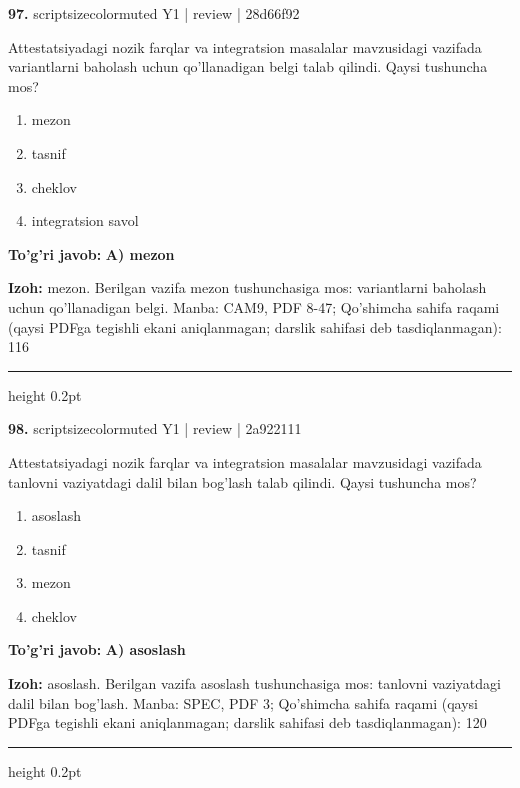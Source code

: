 \documentclass[10pt,a4paper]{article}
\begin{document}
{\bfseries\sffamily\color{ink} 97.} {scriptsizecolor{muted} Y1 | review | 28d66f92}
\par
Attestatsiyadagi nozik farqlar va integratsion masalalar mavzusidagi vazifada variantlarni baholash uchun qo'llanadigan belgi talab qilindi. Qaysi tushuncha mos?
\begin{enumerate}[label=\Alph*),leftmargin=9mm]
\item mezon
\item tasnif
\item cheklov
\item integratsion savol
\end{enumerate}
\begin{tcolorbox}[enhanced,breakable,colback=teal!4,colframe=teal!60!black,boxrule=0.45pt,arc=1.2mm,left=2.7mm,right=2.7mm,top=1.8mm,bottom=1.8mm,before skip=2mm,after skip=2mm]
{\bfseries\sffamily\color{teal}To'g'ri javob:} \textbf{A) mezon}
\par\smallskip
{\bfseries Izoh:} mezon. Berilgan vazifa mezon tushunchasiga mos: variantlarni baholash uchun qo'llanadigan belgi. Manba: CAM9, PDF 8-47; Qo'shimcha sahifa raqami (qaysi PDFga tegishli ekani aniqlanmagan; darslik sahifasi deb tasdiqlanmagan): 116
\end{tcolorbox}
\vspace{2mm}\hrule height 0.2pt\vspace{3mm}

{\bfseries\sffamily\color{ink} 98.} {scriptsizecolor{muted} Y1 | review | 2a922111}
\par
Attestatsiyadagi nozik farqlar va integratsion masalalar mavzusidagi vazifada tanlovni vaziyatdagi dalil bilan bog'lash talab qilindi. Qaysi tushuncha mos?
\begin{enumerate}[label=\Alph*),leftmargin=9mm]
\item asoslash
\item tasnif
\item mezon
\item cheklov
\end{enumerate}
\begin{tcolorbox}[enhanced,breakable,colback=teal!4,colframe=teal!60!black,boxrule=0.45pt,arc=1.2mm,left=2.7mm,right=2.7mm,top=1.8mm,bottom=1.8mm,before skip=2mm,after skip=2mm]
{\bfseries\sffamily\color{teal}To'g'ri javob:} \textbf{A) asoslash}
\par\smallskip
{\bfseries Izoh:} asoslash. Berilgan vazifa asoslash tushunchasiga mos: tanlovni vaziyatdagi dalil bilan bog'lash. Manba: SPEC, PDF 3; Qo'shimcha sahifa raqami (qaysi PDFga tegishli ekani aniqlanmagan; darslik sahifasi deb tasdiqlanmagan): 120
\end{tcolorbox}
\vspace{2mm}\hrule height 0.2pt\vspace{3mm}
\end{document}
